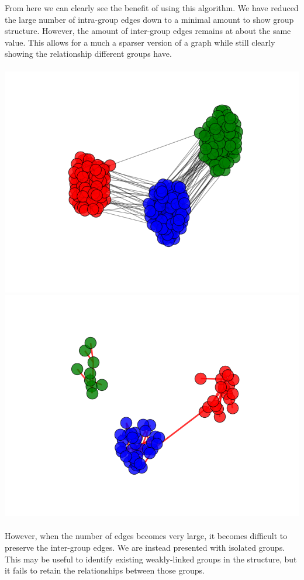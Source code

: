 \documentclass{article}
\begin{document}
From here we can clearly see the benefit of using this algorithm. We have reduced the large number of intra-group edges down to a minimal amount to show group structure. However, the amount of inter-group edges remains at about the same value. This allows for a much a sparser version of a graph while still clearly showing the relationship different groups have.
\\\\
\includegraphics[scale=0.4]{imgs/reddit_large/original.png}
\includegraphics[scale=0.4]{imgs/reddit_large/hard.png}
\\\\
However, when the number of edges becomes very large, it becomes difficult to preserve the inter-group edges. We are instead presented with isolated groups. This may be useful to identify existing weakly-linked groups in the structure, but it fails to retain the relationships between those groups.
\end{document}
